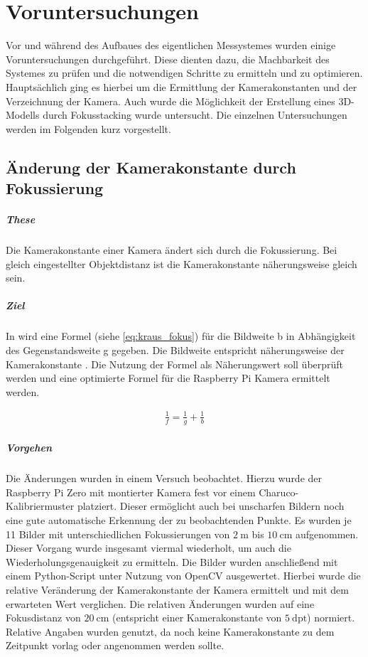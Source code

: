 \documentclass[./00PhotoBox.tex]{subfiles}
\begin{document}
\chapter{Voruntersuchungen}
\label{c:voruntersuchungen}
Vor und während des Aufbaues des eigentlichen Messystemes wurden einige Voruntersuchungen durchgeführt. Diese dienten dazu, die Machbarkeit des Systemes zu prüfen und die notwendigen Schritte zu ermitteln und zu optimieren. Hauptsächlich ging es hierbei um die Ermittlung der Kamerakonstanten und der Verzeichnung der Kamera. Auch wurde die Möglichkeit der Erstellung eines 3D-Modells durch Fokusstacking wurde untersucht. Die einzelnen Untersuchungen werden im Folgenden kurz vorgestellt.

\section{Änderung der Kamerakonstante durch Fokussierung}
\label{sec:fokus}

\paragraph{These}
Die Kamerakonstante einer Kamera ändert sich durch die Fokussierung. Bei gleich eingestellter Objektdistanz ist die Kamerakonstante näherungsweise gleich sein.

\paragraph{Ziel}
In \citet[S. 59]{kraus} wird eine Formel (siehe \autoref{eq:kraus_fokus}) für die \Gls{Bildweite} b in Abhängigkeit des Gegenstandsweite g gegeben. Die Bildweite entspricht näherungsweise der Kamerakonstante \citep[S. 59]{kraus}. Die Nutzung der Formel als Näherungswert soll überprüft werden und eine optimierte Formel für die Raspberry Pi Kamera ermittelt werden.

\begin{align}
    \frac{1}{f} = \frac{1}{g} + \frac{1}{b}
    \label{eq:kraus_fokus}
\end{align}

\paragraph{Vorgehen}
Die Änderungen wurden in einem Versuch beobachtet. Hierzu wurde der Raspberry Pi Zero mit montierter Kamera fest vor einem Charuco-Kalibriermuster platziert. Dieser ermöglicht auch bei unscharfen Bildern noch eine gute automatische Erkennung der zu beobachtenden Punkte. Es wurden je 11 Bilder mit unterschiedlichen Fokussierungen von $2~\text{m}$ bis  $10~\text{cm}$ aufgenommen. Dieser Vorgang wurde insgesamt viermal wiederholt, um auch die Wiederholungsgenauigkeit zu ermitteln. Die Bilder wurden anschließend mit einem Python-Script unter Nutzung von OpenCV ausgewertet. Hierbei wurde die relative Veränderung der Kamerakonstante der Kamera ermittelt und mit dem erwarteten Wert verglichen. Die relativen Änderungen wurden auf eine Fokusdistanz von $20~\text{cm}$ (entspricht einer Kamerakonstante von $5~\text{dpt}$) normiert. Relative Angaben wurden genutzt, da noch keine Kamerakonstante zu dem Zeitpunkt vorlag oder angenommen werden sollte.
\end{document}
